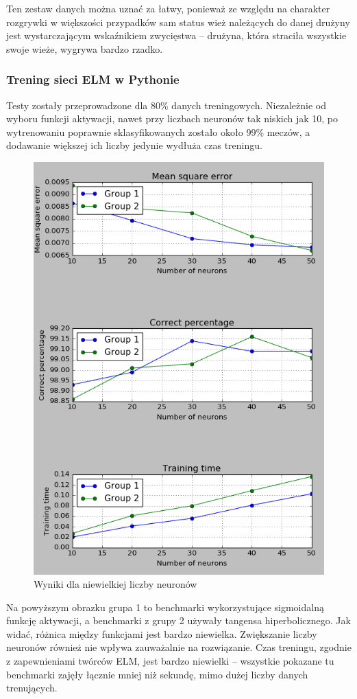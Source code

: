 \documentclass{article}
\begin{document}
Ten zestaw danych można uznać za łatwy, ponieważ ze względu na charakter rozgrywki w większości przypadków sam status wież należących do danej drużyny jest wystarczającym wskaźnikiem zwycięstwa -- drużyna, która straciła wszystkie swoje wieże, wygrywa bardzo rzadko.
\subsubsection{Trening sieci ELM w Pythonie}
Testy zostały przeprowadzone dla 80\% danych treningowych. Niezależnie od wyboru funkcji aktywacji, nawet przy liczbach neuronów tak niskich jak 10, po wytrenowaniu poprawnie sklasyfikowanych zostało około 99\% meczów, a dodawanie większej ich liczby jedynie wydłuża czas treningu. 

\begin{figure}[H]
\centering
\includegraphics[width=\textwidth]{wyniki_dota2_python.png}
\caption{Wyniki dla niewielkiej liczby neuronów}
\end{figure}
Na powyższym obrazku grupa 1 to benchmarki wykorzystujące sigmoidalną funkcję aktywacji, a benchmarki z grupy 2 używały tangensa hiperbolicznego. Jak widać, różnica między funkcjami jest bardzo niewielka. Zwiększanie liczby neuronów również nie wpływa zauważalnie na rozwiązanie. Czas treningu, zgodnie z zapewnieniami twórców ELM, jest bardzo niewielki -- wszystkie pokazane tu benchmarki zajęły łącznie mniej niż sekundę, mimo dużej liczby danych trenujących. 
\end{document}
